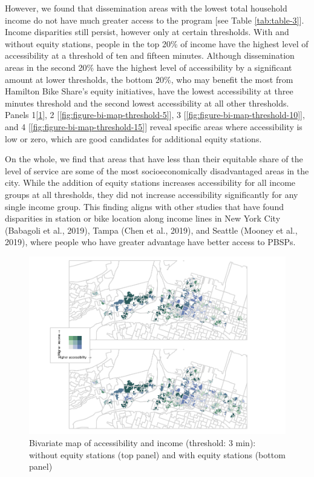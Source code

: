 \documentclass[]{elsarticle} %
\begin{document}
However, we found that dissemination areas with the lowest total
household income do not have much greater access to the program {[}see
Table \ref{tab:table-3}{]}. Income disparities still persist, however
only at certain thresholds. With and without equity stations, people in
the top 20\% of income have the highest level of accessibility at a
threshold of ten and fifteen minutes. Although dissemination areas in
the second 20\% have the highest level of accessibility by a significant
amount at lower thresholds, the bottom 20\%, who may benefit the most
from Hamilton Bike Share's equity initiatives, have the lowest
accessibility at three minutes threshold and the second lowest
accessibility at all other thresholds. Panels
1{[}\ref{fig:figure-bi-map-threshold-3}{]}, 2
{[}\ref{fig:figure-bi-map-threshold-5}{]}, 3
{[}\ref{fig:figure-bi-map-threshold-10}{]}, and 4
{[}\ref{fig:figure-bi-map-threshold-15}{]} reveal specific areas where
accessibility is low or zero, which are good candidates for additional
equity stations.

On the whole, we find that areas that have less than their equitable
share of the level of service are some of the most socioeconomically
disadvantaged areas in the city. While the addition of equity stations
increases accessibility for all income groups at all thresholds, they
did not increase accessibility significantly for any single income
group. This finding aligns with other studies that have found
disparities in station or bike location along income lines in New York
City (Babagoli et al., 2019), Tampa (Chen et al., 2019), and Seattle
(Mooney et al., 2019), where people who have greater advantage have
better access to PBSPs.

\begin{figure}
\includegraphics[width=1\linewidth]{Bike-share-spatial-equity_files/figure-latex/figure-bi-map-threshold-3-1} \caption{\label{fig-bivariate-map-threshold-3}Bivariate map of accessibility and income (threshold: 3 min): without equity stations (top panel) and with equity stations (bottom panel)}\label{fig:figure-bi-map-threshold-3}
\end{figure}
\end{document}
